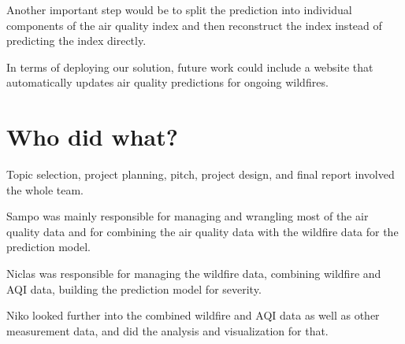 \documentclass[a4paper,12pt]{article}
\begin{document}
Another important step would be to split the prediction into individual components of the air quality index and then reconstruct the index instead of predicting the index directly.

In terms of deploying our solution, future work could include a website that automatically updates air quality predictions for ongoing wildfires.

\section{Who did what?}

Topic selection, project planning, pitch, project design, and final report involved the whole team.

Sampo was mainly responsible for managing and wrangling most of the air quality data and for combining the air quality data with the wildfire data for the prediction model.

Niclas was responsible for managing the wildfire data, combining wildfire and AQI data, building the prediction model for severity.

Niko looked further into the combined wildfire and AQI data as well as other measurement data, and did the analysis and visualization for that.
\end{document}
